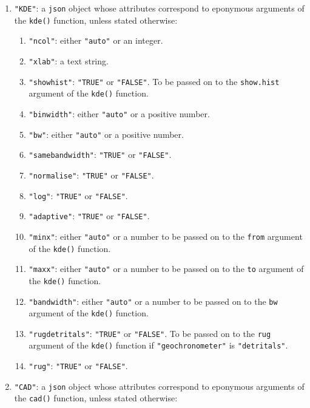 \begin{refsection}
\begin{enumerate}[leftmargin=\parindent,align=left,
      labelwidth=\parindent,label*=2.\arabic*.]
\begin{enumerate}[leftmargin=\parindent,align=left,
      labelwidth=\parindent,label*=\arabic*.]
  \end{enumerate}  
\item{\tt "KDE"}: a \texttt{json} object whose attributes correspond
  to eponymous arguments of the \texttt{kde()} function, unless stated
  otherwise:
  \begin{enumerate}[leftmargin=\parindent,align=left,
      labelwidth=\parindent,label*=\arabic*.]
    \item{\tt "ncol"}: either \texttt{"auto"} or an integer.
    \item{\tt "xlab"}: a text string.
    \item{\tt "showhist"}: \texttt{"TRUE"} or \texttt{"FALSE"}. To be
      passed on to the \texttt{show.hist} argument of the
      \texttt{kde()} function.
    \item{\tt "binwidth"}: either \texttt{"auto"} or a positive
      number.
    \item{\tt "bw"}: either \texttt{"auto"} or a positive number.
    \item{\tt "samebandwidth"}: \texttt{"TRUE"} or \texttt{"FALSE"}.
    \item{\tt "normalise"}: \texttt{"TRUE"} or \texttt{"FALSE"}.
    \item{\tt "log"}: \texttt{"TRUE"} or \texttt{"FALSE"}.
    \item{\tt "adaptive"}: \texttt{"TRUE"} or \texttt{"FALSE"}.
    \item{\tt "minx"}: either \texttt{"auto"} or a number to be passed
      on to the \texttt{from} argument of the \texttt{kde()} function.
    \item{\tt "maxx"}: either \texttt{"auto"} or a number to be passed
      on to the \texttt{to} argument of the \texttt{kde()} function.
    \item{\tt "bandwidth"}: either \texttt{"auto"} or a number to be
      passed on to the \texttt{bw} argument of the \texttt{kde()}
      function.
    \item{\tt "rugdetritals"}: \texttt{"TRUE"} or \texttt{"FALSE"}.
      To be passed on to the \texttt{rug} argument of the
      \texttt{kde()} function if \texttt{"geochronometer"} is
      \texttt{"detritals"}.
    \item{\tt "rug"}: \texttt{"TRUE"} or \texttt{"FALSE"}.
  \end{enumerate}  
\item{\tt "CAD"}: a \texttt{json} object whose attributes correspond
  to eponymous arguments of the \texttt{cad()} function, unless stated
  otherwise:
  \begin{enumerate}[leftmargin=\parindent,align=left,
      labelwidth=\parindent,label*=\arabic*.]

\end{enumerate}
\end{enumerate}
\end{refsection}
